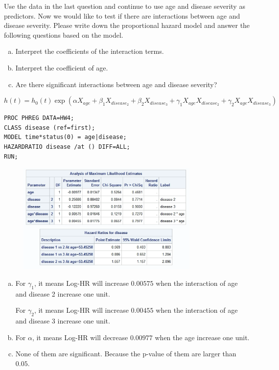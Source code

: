 \documentclass[12pt]{elegantbook}
\begin{document}
    \begin{exercise*}[3]
        Use the data in the last question and continue to use age and disease severity as predictors. Now we would like to test if there are interactions between age and disease severity. Please write down the proportional hazard model and answer the following questions based on the model. 
        \begin{enumerate}[(a)]
            \item Interpret the coefficients of the interaction terms. 
            \item Interpret the coefficient of age.
            \item Are there significant interactions between age and disease severity?
        \end{enumerate}
    \end{exercise*}

    \begin{solution}
        \[h(t)=h_0(t)\exp(\alpha X_{age}+\beta_1 X_{disease_2}+\beta_2 X_{disease_3}+\gamma_1X_{age}X_{disease_2}+\gamma_2X_{age}X_{disease_3})\]
    \end{solution}
    \begin{verbatim}
PROC PHREG DATA=HW4;
CLASS disease (ref=first);
MODEL time*status(0) = age|disease;
HAZARDRATIO disease /at () DIFF=ALL;
RUN;
    \end{verbatim}
    \begin{figure}[H]
        \centering
        \includegraphics[width=0.8\textwidth]{HW4_2.png}
    \end{figure}
    \begin{enumerate}[(a)]
        \item For $\gamma_1$, it means Log-HR will increase $0.00575$ when the interaction of age and disease 2 increase one unit. 
        
        For $\gamma_2$, it means Log-HR will increase $0.00455$ when the interaction of age and disease 3 increase one unit. 
        \item For $\alpha$, it means Log-HR will decrease $0.00977$ when the age increase one unit. 
        \item None of them are significant. Because the p-value of them are larger than $0.05$.
    \end{enumerate}
    
\end{document}
